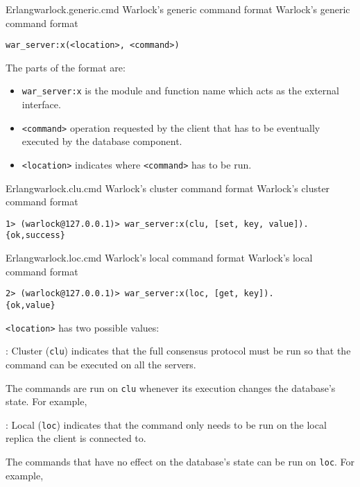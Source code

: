 \begin{scode}{Erlang}{warlock.generic.cmd}{%
  Warlock's generic command format}{%
  Warlock's generic command format}
  \begin{lstlisting}
war_server:x(<location>, <command>)
  \end{lstlisting}
\end{scode}

The parts of the format are:

\begin{itemize}
  \item \texttt{war\_server:x} is the module and function name which acts
    as the external interface.
  \item \texttt{<command>} operation requested by the client that has to
    be eventually executed by the database component.
  \item \texttt{<location>} indicates where \texttt{<command>} has to be
    run.
\end{itemize}

\begin{scode}{Erlang}{warlock.clu.cmd}{%
  Warlock's cluster command format}{%
  Warlock's cluster command format}
  \begin{lstlisting}
1> (warlock@127.0.0.1)> war_server:x(clu, [set, key, value]).
{ok,success}
  \end{lstlisting}
\end{scode}


\begin{scode}{Erlang}{warlock.loc.cmd}{%
  Warlock's local command format}{%
  Warlock's local command format}
  \begin{lstlisting}
2> (warlock@127.0.0.1)> war_server:x(loc, [get, key]).
{ok,value}
  \end{lstlisting}
\end{scode}

\texttt{<location>} has two possible values:

\begin{itemize}
    : Cluster (\texttt{clu}) indicates that the full
    consensus protocol must be run so that the command can be executed
    on all the servers.

    The commands are run on \texttt{clu} whenever its execution changes
    the database's state. For example, 

    : Local (\texttt{loc}) indicates that the command only
    needs to be run on the local replica the client is connected to.

    The commands that have no effect on the database's state can be run
    on \texttt{loc}. For example, 
\end{itemize}


